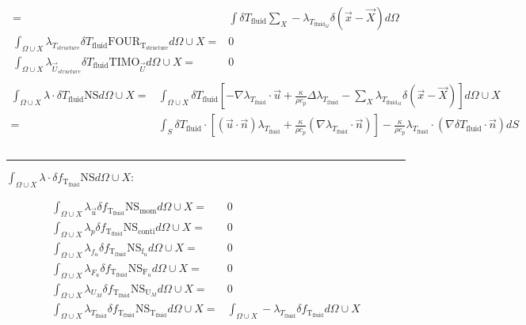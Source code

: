 \documentclass[10pt]{article} %
\begin{document}
\begin{center}
\begin{align*}
	=& \int \delta T_{\text{fluid}} \sum_{X} -\lambda_{T_{\text{fluid}_M}} \delta (\vec{x}-\vec{X}) d\Omega\\
	\int_{\Omega \cup X} \lambda_{T_{structure}} \delta T_{\text{fluid}} \text{FOUR}_{\text{T}_{\text{structure}}} d\Omega \cup X =& 0\\
	\int_{\Omega \cup X} \lambda_{\vec{U}_{structure}} \delta T_{\text{fluid}} \text{TIMO}_{\vec{U}} d\Omega \cup X =& 0\\
\end{align*}
\begin{align*}
	\int_{\Omega \cup X} \lambda \cdot \delta T_{\text{fluid}} \text{NS}d\Omega \cup X 
	=&\int_{\Omega \cup X} \delta T_{\text{fluid}} \left[ -\nabla \lambda_{T_{\text{fluid}}} \cdot \vec{u} + \frac{\kappa}{\rho c_p} \Delta  \lambda_{T_{\text{fluid}}} - \sum_{X} \lambda_{T_{\text{fluid}_M}} \delta (\vec{x}-\vec{X})\right] d\Omega \cup X\\
	=&\int_{S} \delta T_{\text{fluid}} \cdot \left[\left(\vec{u}\cdot \vec{n}\right) \lambda_{T_{\text{fluid}}}  + \frac{\kappa}{\rho c_p} \left(\nabla \lambda_{T_{\text{fluid}}} \cdot \vec{n}\right)\right]- \frac{\kappa}{\rho c_p} \lambda_{T_{\text{fluid}}} \cdot \left(\nabla \delta T_{\text{fluid}} \cdot \vec{n}\right) dS\\\\
\end{align*}
\noindent\rule[1ex]{\textwidth}{1pt}
\begin{flushleft}
	$\int_{\Omega \cup X} \lambda \cdot \delta f_{\text{T}_{\text{fluid}}} \text{NS}d\Omega \cup X :$
\end{flushleft}
\begin{align*}
	\int_{\Omega \cup X} \lambda_{\vec{u}} \delta f_{\text{T}_{\text{fluid}}} \text{NS}_{\text{mom}} d\Omega \cup X =&  0\\
	\int_{\Omega \cup X} \lambda_p \delta f_{\text{T}_{\text{fluid}}} \text{NS}_{\text{conti}} d\Omega \cup X =& 0\\
	\int_{\Omega \cup X} \lambda_{f_u} \delta f_{\text{T}_{\text{fluid}}} \text{NS}_{\text{f}_u} d\Omega \cup X =& 0\\
	\int_{\Omega \cup X} \lambda_{F_u} \delta f_{\text{T}_{\text{fluid}}} \text{NS}_{\text{F}_u} d\Omega \cup X =& 0\\
	\int_{\Omega \cup X} \lambda_{U_M} \delta f_{\text{T}_{\text{fluid}}} \text{NS}_{\text{U}_M} d\Omega \cup X =& 0\\
	\int_{\Omega \cup X} \lambda_{T_{\text{fluid}}} \delta f_{\text{T}_{\text{fluid}}} \text{NS}_{\text{T}_{\text{fluid}}} d\Omega \cup X =& \int_{\Omega \cup X} -\lambda_{T_{\text{fluid}}}\delta f_{\text{T}_{\text{fluid}}}d\Omega \cup X\\

\end{align*}
\end{center}
\end{document}
